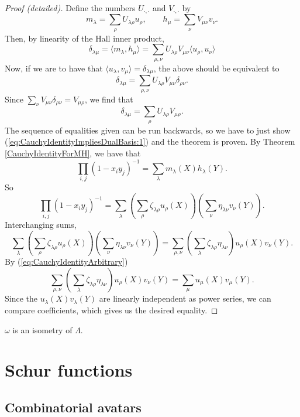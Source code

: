 \documentclass{article}
\begin{document}
\begin{proof}[Proof (detailed)]
    Define the numbers $U_{\cdot,\cdot}$ and $V_{\cdot,\cdot}$ by
    \[
        m_\lambda = \sum_\rho U_{\lambda\rho} u_\rho, \qquad h_\mu = \sum_\nu V_{\mu\nu} v_\nu.
    \]
    Then, by linearity of the Hall inner product,
    \[
        \delta_{\lambda\mu} = \langle m_\lambda, h_\mu \rangle = \sum_{\rho,\nu}U_{\lambda\rho} V_{\mu\nu} \langle u_\rho, u_\nu \rangle
    \]
    Now, if we are to have that $\langle u_\lambda, v_\mu \rangle = \delta_{\lambda\mu}$, the above should be equivalent to 
    \[
        \delta_{\lambda\mu} = \sum_{\rho,\nu} U_{\lambda\rho} V_{\mu\nu} \delta_{\rho\nu}.
    \]
    Since $\sum_\nu V_{\mu\nu}\delta_{\rho\nu} = V_{\mu\rho}$, we find that
    \begin{equation}\label{eq:CauchyIdentityImpliesDualBasis:1}
        \delta_{\lambda\mu} =  \sum_\rho U_{\lambda\rho} V_{\mu\rho}.
    \end{equation}
    The sequence of equalities given can be run backwards, so we have to just show (\ref{eq:CauchyIdentityImpliesDualBasis:1}) and the theorem is proven.
    By Theorem \ref{CauchyIdentityForMH}, we have that
    \[
        \prod_{i,j}(1-x_iy_j)^{-1} = \sum_\lambda m_\lambda(X) h_\lambda(Y).
    \]
    So 
    \[
        \prod_{i,j}(1-x_iy_j)^{-1} = \sum_\lambda \left(\sum_\rho \zeta_{\lambda\rho} u_\rho(X)\right)\left(\sum_\nu \eta_{\lambda\nu}v_\nu(Y)\right).
    \]
    Interchanging sums,
    \[
        \sum_\lambda \left(\sum_\rho \zeta_{\lambda\rho} u_\rho(X)\right)\left(\sum_\nu \eta_{\lambda\nu}v_\nu(Y)\right) = \sum_{\rho,\nu} \left(\sum_\lambda \zeta_{\lambda\rho} \eta_{\lambda\nu}\right) u_\rho(X) v_\nu(Y).
    \]
    By (\ref{eq:CauchyIdentityArbitrary})
    \[
        \sum_{\rho,\nu} \left(\sum_\lambda \zeta_{\lambda\rho} \eta_{\lambda\nu}\right) u_\rho(X) v_\nu(Y) = \sum_\mu u_\mu(X) v_\mu(Y).
    \]
    Since the $u_\lambda(X)v_\lambda(Y)$ are linearly independent as power series, we can compare coefficients, which gives us the desired equality.
\end{proof}

\begin{theorem}
    $\omega$ is an isometry of $\Lambda$.
\end{theorem}

\section{Schur functions}\label{ch:schurs}
\subsection{Combinatorial avatars}
\end{document}
